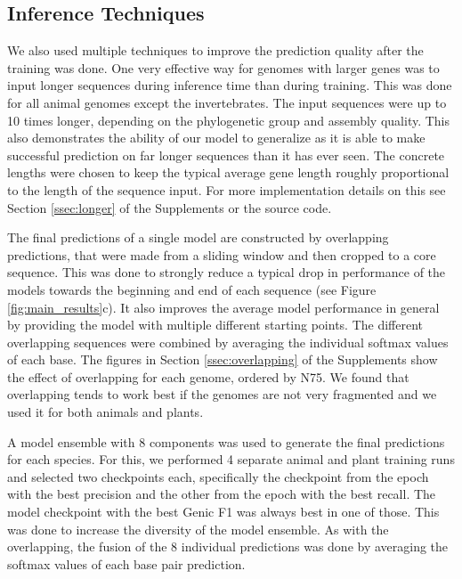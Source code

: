 \documentclass{bioinfo}
\begin{document}
\begin{methods}
\subsection{Inference Techniques}
We also used multiple techniques to improve the prediction quality after the 
training was done. One very effective way for genomes with larger genes was to input 
longer sequences during inference time than during training. This was done for all 
animal genomes except the invertebrates. The input sequences were up to 10 times 
longer, depending on the phylogenetic group and assembly quality. This also demonstrates the 
ability of our model to generalize as it is able to make successful prediction on 
far longer sequences than it has ever seen. The 
concrete lengths were chosen to keep the typical average gene length roughly 
proportional to the length of the sequence input. For more implementation details 
on this see Section \ref{ssec:longer} of the Supplements or the source code.
	
The final predictions of a single model are constructed by overlapping predictions, 
that were made from a sliding window and then cropped to a core sequence. This was done 
to strongly reduce a typical drop in performance of the models towards the beginning 
and end of each sequence (see Figure \ref{fig:main_results}c). It also improves the 
average model performance in general by providing the model with multiple different 
starting points. The different overlapping sequences were combined by averaging 
the individual softmax values of each base. The figures in Section \ref{ssec:overlapping} of the 
Supplements show the effect of overlapping for each genome, ordered by N75. We found 
that overlapping tends to work best if the genomes are not very fragmented and we 
used it for both animals and plants.

A model ensemble with 8 components was used to generate the final predictions for 
each species. For this, we performed 4 separate animal and plant training runs and 
selected two checkpoints each, specifically the checkpoint from the epoch with the best precision and the  %
other from the epoch with the best recall. The model checkpoint with the best Genic F1 was always best in one of 
those. This was done to increase the diversity of the model ensemble. As with the 
overlapping, the fusion of the 8 individual predictions was done by averaging the 
softmax values of each base pair prediction.


\end{methods}
\end{document}
